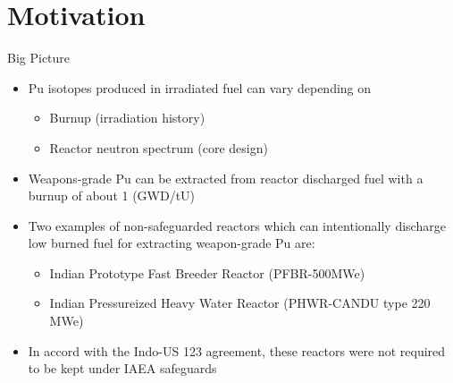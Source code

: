 \documentclass{beamer}
\begin{document}
\section{Motivation}
\begin{frame}{Big Picture}
\begin{itemize}
\item{Pu isotopes produced in irradiated fuel can vary depending on}
  \begin{itemize}
  \item{Burnup (irradiation history)}
  \item{Reactor neutron spectrum (core design)}
  \end{itemize}
\item{Weapons-grade Pu can be extracted from reactor discharged fuel
  with a burnup of about 1 (GWD/tU)}
\item{Two examples of non-safeguarded reactors which can intentionally
  discharge low burned fuel for extracting weapon-grade Pu are:}
  \begin{itemize}
  \item{Indian Prototype Fast Breeder Reactor (PFBR-500MWe)}
  \item{Indian Pressureized Heavy Water Reactor (PHWR-CANDU type 220 MWe)}
  \end{itemize}
\item{In accord with the Indo-US 123 agreement, these reactors were not
      required to be kept under IAEA safeguards}
\end{itemize}
\end{frame}
\end{document}
